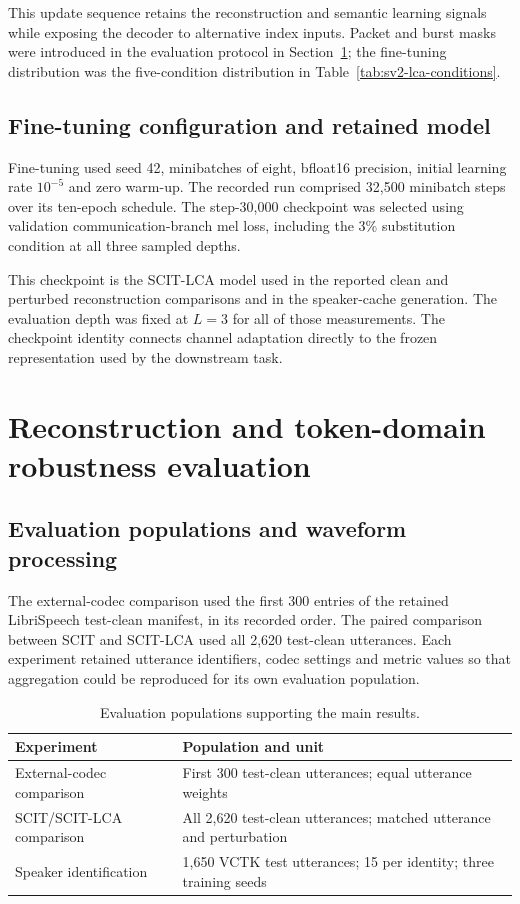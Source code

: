This update sequence retains the reconstruction and semantic learning signals while exposing the decoder to alternative index inputs. Packet and burst masks were introduced in the evaluation protocol in Section~\ref{sec:sv2-evaluation}; the fine-tuning distribution was the five-condition distribution in Table~\ref{tab:sv2-lca-conditions}.

\subsection{Fine-tuning configuration and retained model}
Fine-tuning used seed 42, minibatches of eight, bfloat16 precision, initial learning rate $10^{-5}$ and zero warm-up. The recorded run comprised 32,500 minibatch steps over its ten-epoch schedule. The step-30,000 checkpoint was selected using validation communication-branch mel loss, including the 3\% substitution condition at all three sampled depths.

This checkpoint is the SCIT-LCA model used in the reported clean and perturbed reconstruction comparisons and in the speaker-cache generation. The evaluation depth was fixed at $L=3$ for all of those measurements. The checkpoint identity connects channel adaptation directly to the frozen representation used by the downstream task.

\section{Reconstruction and token-domain robustness evaluation}
\label{sec:sv2-evaluation}

\subsection{Evaluation populations and waveform processing}
The external-codec comparison used the first 300 entries of the retained LibriSpeech test-clean manifest, in its recorded order. The paired comparison between SCIT and SCIT-LCA used all 2,620 test-clean utterances. Each experiment retained utterance identifiers, codec settings and metric values so that aggregation could be reproduced for its own evaluation population.

\begin{table}[t]
\centering
\caption{Evaluation populations supporting the main results.}
\label{tab:sv2-populations}
\small
\begin{tabularx}{\columnwidth}{@{}lY@{}}
\toprule
Experiment & Population and unit\\
\midrule
External-codec comparison & First 300 test-clean utterances; equal utterance weights\\
SCIT/SCIT-LCA comparison & All 2,620 test-clean utterances; matched utterance and perturbation\\
Speaker identification & 1,650 VCTK test utterances; 15 per identity; three training seeds\\
\bottomrule
\end{tabularx}
\end{table}


